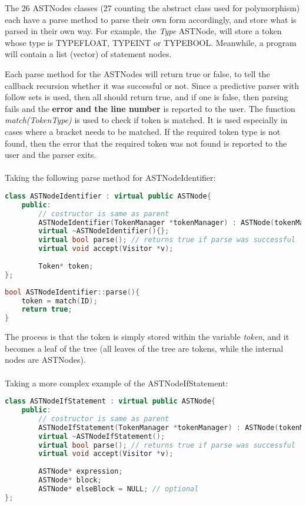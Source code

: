 The 26 ASTNodes classes (27 counting the abstract class used for polymorphism) each have a parse method to parse their own form accordingly, and store what is parsed in their own way. For example, the \textit{Type} ASTNode, will store a token whose type is TYPE\un FLOAT, TYPE\un INT or TYPE\un BOOL. Meanwhile, a program will contain a list (vector) of statement nodes.

Each parse method for the ASTNodes will return true or false, to tell the callback recursion whether it was successful or not. Since a predictive parser with follow sets is used, then all should return true, and if one is false, then parsing fails and the \textbf{error and the line number} is reported to the user. The function \textit{match(TokenType)} is used to check if  token is matched. It is used especially in cases where a bracket needs to be matched. If the required token type is not found, then the error that the required token was not found is reported to the user and the parser exits.
\\ \\
Taking the following parse method for ASTNodeIdentifier:
\begin{lstlisting}[language=C++]
class ASTNodeIdentifier : virtual public ASTNode{
	public:
		// costructor is same as parent
		ASTNodeIdentifier(TokenManager *tokenManager) : ASTNode(tokenManager) {};
		virtual ~ASTNodeIdentifier(){};
		virtual bool parse(); // returns true if parse was successful
		virtual void accept(Visitor *v);
		
		Token* token;
};
\end{lstlisting}

\begin{lstlisting}[language=C++]
bool ASTNodeIdentifier::parse(){
	token = match(ID);
	return true;
}
\end{lstlisting}
The process is that the token is simply stored within the variable \textit{token}, and it becomes a leaf of the tree (all leaves of the tree are tokens, while the internal nodes are ASTNodes).
\\\\
Taking a more complex example of the ASTNodeIfStatement:
\begin{lstlisting}[language=C++]
class ASTNodeIfStatement : virtual public ASTNode{
	public:
		// costructor is same as parent
		ASTNodeIfStatement(TokenManager *tokenManager) : ASTNode(tokenManager) {};
		virtual ~ASTNodeIfStatement();
		virtual bool parse(); // returns true if parse was successful
		virtual void accept(Visitor *v);
		
		ASTNode* expression;
		ASTNode* block;
		ASTNode* elseBlock = NULL; // optional
};
\end{lstlisting}

